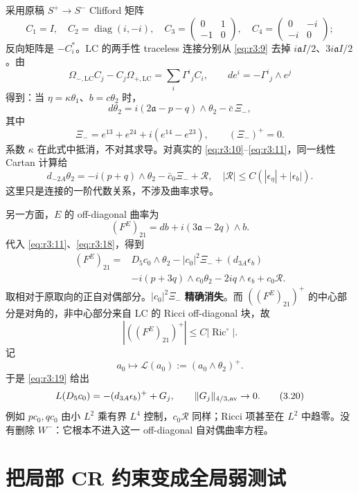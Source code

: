 \documentclass[UTF8,11pt,openany,oneside,fontset=none]{ctexbook}
\begin{document}
采用原稿 \(S^+\to S^-\) Clifford 矩阵 \[
 C_1=I,\quad C_2=\operatorname{diag}(i,-i),\quad
 C_3=\begin{pmatrix}0&1\\-1&0\end{pmatrix},\quad
 C_4=\begin{pmatrix}0&-i\\-i&0\end{pmatrix};
\] 反向矩阵是 \(-C_i^*\)。LC 的两手性 traceless 连接分别从 \eqref{eq:r3:9} 去掉 \(i\mathfrak a I/2\)、\(3i\mathfrak a I/2\)。由 \[
 \Omega_{-,\mathrm{LC}}C_j-C_j\Omega_{+,\mathrm{LC}}
       =\sum_i\Gamma^i{}_j C_i,
 \qquad de^i=-\Gamma^i{}_j\wedge e^j
\] 得到：当 \(\eta=\kappa\theta_1\)、\(b=c\theta_2\) 时， \[
 \boxed{d\theta_2=i(2\mathfrak a-p-q)\wedge\theta_2
                    -\bar c\,\Xi_-,}
 \tag{3.17}\label{eq:r3:17}
\] 其中 \[
 \Xi_-=e^{13}+e^{24}+i(e^{14}-e^{23}),\qquad (\Xi_-)^+=0.
\] 系数 \(\kappa\) 在此式中抵消，不对其求导。对真实的 \eqref{eq:r3:10}--\eqref{eq:r3:11}，同一线性 Cartan 计算给 \[
 d_{-2A}\theta_2=-i(p+q)\wedge\theta_2-\bar c_0\Xi_-+\mathcal R,
 \quad |\mathcal R|\le C(|\epsilon_\eta|+|\epsilon_b|).
 \tag{3.18}\label{eq:r3:18}
\] 这里只是连接的一阶代数关系，不涉及曲率求导。

另一方面，\(E\) 的 off-diagonal 曲率为 \[
 (F^E)_{21}=db+i(3\mathfrak a-2q)\wedge b.
\] 代入 \eqref{eq:r3:11}、\eqref{eq:r3:18}，得到 \[
 \begin{aligned}
 (F^E)_{21}={}&D_5c_0\wedge\theta_2-|c_0|^2\Xi_-
       +(d_{3A}\epsilon_b)\\
 &-i(p+3q)\wedge c_0\theta_2
       -2iq\wedge\epsilon_b+c_0\mathcal R.
 \end{aligned}
 \tag{3.19}\label{eq:r3:19}
\] 取相对于原取向的正自对偶部分。\(|c_0|^2\Xi_-\) \textbf{精确消失}。而 \(((F^E)_{21})^+\) 的中心部分是对角的，非中心部分来自 LC 的 Ricci off-diagonal 块，故 \[
 |((F^E)_{21})^+|\le C|\operatorname{Ric}^{\circ}|.
\] 记 \[
 a_0\mapsto\mathcal L(a_0):=(a_0\wedge\theta_2)^+.
\] 于是 \eqref{eq:r3:19} 给出 \[
 \mathcal L(D_5c_0)=-(d_{3A}\epsilon_b)^++G_j,
 \qquad \|G_j\|_{4/3,\rm av}\to0.
 \tag{3.20}\label{eq:r3:20}
\] 例如 \(pc_0,qc_0\) 由小 \(L^2\) 乘有界 \(L^4\) 控制，\(c_0\mathcal R\) 同样；Ricci 项甚至在 \(L^2\) 中趋零。没有删除 \(W^-\)：它根本不进入这一 off-diagonal 自对偶曲率方程。

\section{把局部 CR 约束变成全局弱测试}\label{ch3:ux628aux5c40ux90e8-cr-ux7ea6ux675fux53d8ux6210ux5168ux5c40ux5f31ux6d4bux8bd5}
\end{document}
